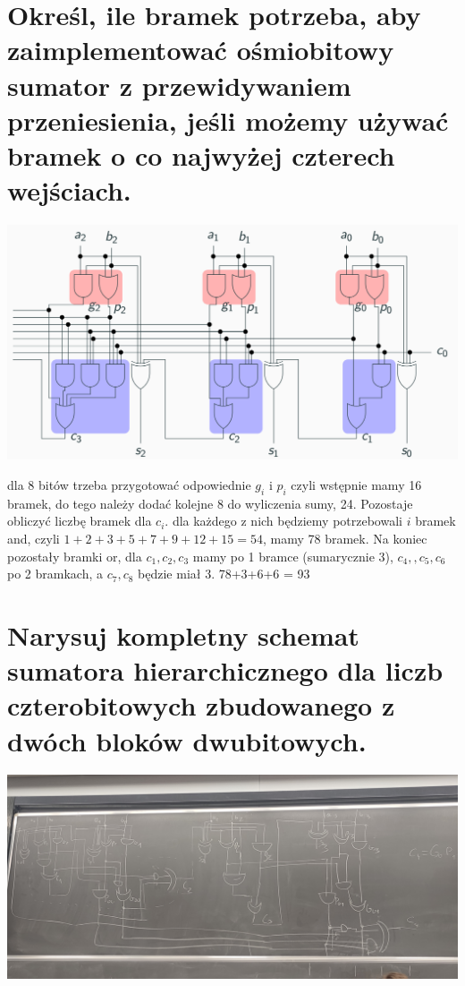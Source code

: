 \documentclass{article}
\begin{document}
\begin{enumerate}
\begin{enumerate}
	\section{Określ, ile bramek potrzeba, aby zaimplementować ośmiobitowy sumator z przewidywaniem przeniesienia, jeśli możemy używać bramek o co najwyżej czterech wejściach.}
	\begin{center}
\includegraphics[scale=0.2]{./L03Z04.png}
	\end{center}
	dla 8 bitów trzeba przygotować odpowiednie $g_i$ i $p_i$
	czyli wstępnie mamy 16 bramek, do tego należy dodać kolejne 8 do wyliczenia sumy, 24.
	Pozostaje obliczyć liczbę bramek dla $c_i$.
	dla każdego z nich będziemy potrzebowali $i$ bramek and, czyli $1+2+3+5+7+9+12+15= 54$, mamy 78 bramek. Na koniec pozostały bramki or, dla $c_1,c_2,c_3$ mamy po 1 bramce (sumarycznie 3), $c_4, , c_5, c_6$ po 2 bramkach, a $c_7, c_8$ będzie miał 3. 78+3+6+6 = 93
	\section{Narysuj kompletny schemat sumatora hierarchicznego dla liczb czterobitowych zbudowanego z dwóch bloków dwubitowych.}
	\begin{center}
	\includegraphics[scale=0.075]{./L03Z05.jpg}
	\end{center}

\end{enumerate}
\end{enumerate}
\end{document}
